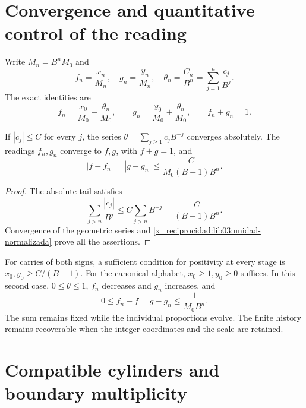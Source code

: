 \section{Convergence and quantitative control of the reading}
\label{x_reciprocidad:lib03:limite}

Write \(M_n=B^nM_0\) and
\begin{equation}
 f_n=\frac{x_n}{M_n},\quad g_n=\frac{y_n}{M_n},\quad
 \theta_n=\frac{C_n}{B^n}=\sum_{j=1}^n\frac{c_j}{B^j}.
 \label{x_reciprocidad:lib03:lecturas-normalizadas}
\end{equation}
The exact identities are
\begin{equation}
 f_n=\frac{x_0}{M_0}-\frac{\theta_n}{M_0},\qquad
 g_n=\frac{y_0}{M_0}+\frac{\theta_n}{M_0},\qquad f_n+g_n=1.
 \label{x_reciprocidad:lib03:unidad-normalizada}
\end{equation}

\begin{theorem}
\label{x_reciprocidad:lib03:teo-limite}
If \(|c_j|\leq C\) for every \(j\), the series
\(\theta=\sum_{j\geq1}c_jB^{-j}\) converges absolutely. The
readings \(f_n,g_n\) converge to \(f,g\), with \(f+g=1\), and
\begin{equation}
 |f-f_n|=|g-g_n|\leq\frac{C}{M_0(B-1)B^n}.
 \label{x_reciprocidad:lib03:cota-cola}
\end{equation}
\end{theorem}

\begin{proof}
The absolute tail satisfies
\[
 \sum_{j>n}\frac{|c_j|}{B^j}
 \leq C\sum_{j>n}B^{-j}=\frac{C}{(B-1)B^n}.
\]
Convergence of the geometric series and
\eqref{x_reciprocidad:lib03:unidad-normalizada} prove all the assertions.
\end{proof}

For carries of both signs, a sufficient condition for positivity
at every stage is \(x_0,y_0\geq C/(B-1)\). For the canonical
alphabet, \(x_0\geq1,y_0\geq0\) suffices. In this second case,
\(0\leq\theta\leq1\), \(f_n\) decreases and \(g_n\) increases, and
\begin{equation}
 0\leq f_n-f=g-g_n\leq\frac1{M_0B^n}.
 \label{x_reciprocidad:lib03:cota-canonica}
\end{equation}
The sum remains fixed while the individual proportions evolve.
The finite history remains recoverable when the integer
coordinates and the scale are retained.

\section{Compatible cylinders and boundary multiplicity}
\label{x_reciprocidad:lib03:cilindros}

